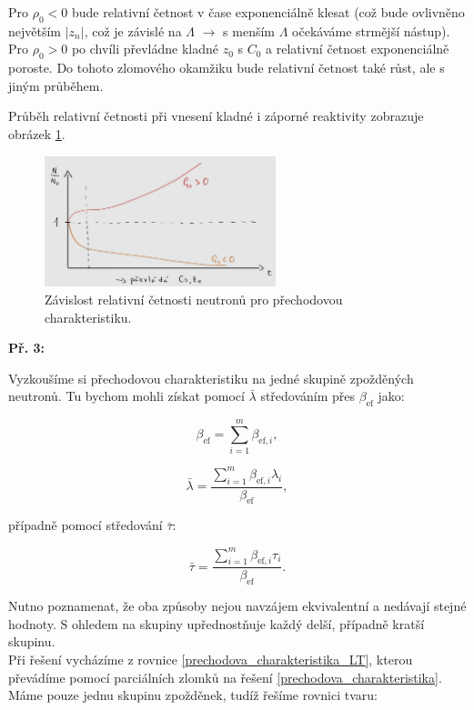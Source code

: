 Pro $\rho_0 < 0$ bude relativní četnost v čase exponenciálně klesat (což bude ovlivněno největším $|z_n|$, což je závislé na $\Lambda$ $\rightarrow$ s menším $\Lambda$ očekáváme strmější nástup).\\

Pro $\rho_0 > 0$ po chvíli převládne kladné $z_0$ s $C_0$ a relativní četnost exponenciálně poroste. Do tohoto zlomového okamžiku bude relativní četnost také růst, ale s jiným průběhem.

Průběh relativní četnosti při vnesení kladné i záporné reaktivity zobrazuje obrázek \ref{fig_prechodova}.

\begin{figure}[H]
  \centering
  \includegraphics[width=0.6\textwidth]{img/prechodova.jpg}
  \caption{Závislost relativní četnosti neutronů pro přechodovou charakteristiku.}
  \label{fig_prechodova}
\end{figure}

\small

\textbf{Př. 3:}

Vyzkoušíme si přechodovou charakteristiku na jedné skupině zpožděných neutronů. Tu bychom mohli získat pomocí $\bar{\lambda}$ středováním přes $\beta_{\text{ef}}$ jako:

$$ \beta_{\text{ef}} = \sum_{i = 1}^m \beta_{\text{ef},i}, $$

$$\bar{\lambda} = \dfrac{\sum_{i=1}^m \beta_{\text{ef},i} \lambda_i}{\beta_{\text{ef}}}, $$

případně pomocí středování $\bar{\tau}$:

$$ \bar{\tau} = \dfrac{\sum_{i=1}^m \beta_{\text{ef},i} \tau_i}{\beta_{\text{ef}}}. $$

Nutno poznamenat, že oba způsoby nejou navzájem ekvivalentní a nedávají stejné hodnoty. S ohledem na skupiny upřednostňuje každý delší, případně kratší skupinu.\\

Při řešení vycházíme z rovnice \eqref{prechodova_charakteristika_LT}, kterou převádíme pomocí parciálních zlomků na řešení \eqref{prechodova_charakteristika}. Máme pouze jednu skupinu zpožděnek, tudíž řešíme rovnici tvaru:

